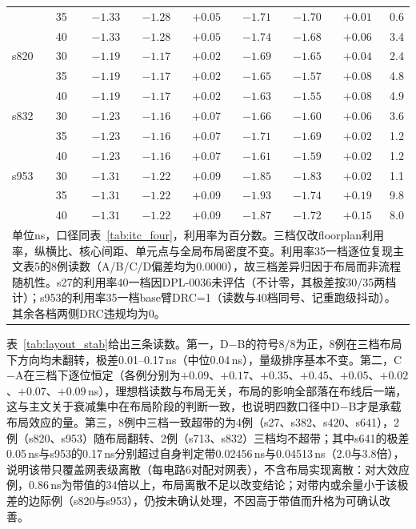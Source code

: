 \documentclass[twocolumn,10pt,fontset=windows]{ctexart}
\begin{document}
\begin{table}[t]
\begin{tabular}{lcrrrrrrr}
 & 35 & $-1.33$ & $-1.28$ & $+0.05$ & $-1.71$ & $-1.70$ & $+0.01$ & 0.6\\
 & 40 & $-1.33$ & $-1.28$ & $+0.05$ & $-1.74$ & $-1.68$ & $+0.06$ & 3.4\\
\midrule
s820 & 30 & $-1.19$ & $-1.17$ & $+0.02$ & $-1.69$ & $-1.65$ & $+0.04$ & 2.4\\
 & 35 & $-1.19$ & $-1.17$ & $+0.02$ & $-1.65$ & $-1.57$ & $+0.08$ & 4.8\\
 & 40 & $-1.19$ & $-1.17$ & $+0.02$ & $-1.63$ & $-1.55$ & $+0.08$ & 4.9\\
\midrule
s832 & 30 & $-1.23$ & $-1.16$ & $+0.07$ & $-1.66$ & $-1.60$ & $+0.06$ & 3.6\\
 & 35 & $-1.23$ & $-1.16$ & $+0.07$ & $-1.71$ & $-1.69$ & $+0.02$ & 1.2\\
 & 40 & $-1.23$ & $-1.16$ & $+0.07$ & $-1.61$ & $-1.59$ & $+0.02$ & 1.2\\
\midrule
s953 & 30 & $-1.31$ & $-1.22$ & $+0.09$ & $-1.85$ & $-1.83$ & $+0.02$ & 1.1\\
 & 35 & $-1.31$ & $-1.22$ & $+0.09$ & $-1.93$ & $-1.74$ & $+0.19$ & 9.8\\
 & 40 & $-1.31$ & $-1.22$ & $+0.09$ & $-1.87$ & $-1.72$ & $+0.15$ & 8.0\\
\bottomrule
\multicolumn{9}{p{0.92\textwidth}}{\footnotesize 单位ns，口径同表~\ref{tab:itc_four}，利用率为百分数。三档仅改floorplan利用率，纵横比、核心间距、单元点与全局布局密度不变。利用率35一档逐位复现主文表5的8例读数（A/B/C/D偏差均为0.0000），故三档差异归因于布局而非流程随机性。s27的利用率40一档因DPL-0036未评估（不计零，其极差按30/35两档计）；s953的利用率35一档base臂DRC=1（读数与40档同号、记重跑级抖动）。其余各档两侧DRC违规均为0。}\\
\end{tabular}
\end{table}

表~\ref{tab:layout_stab}给出三条读数。第一，D$-$B的符号8/8为正，8例在三档布局下方向均未翻转，极差0.01--0.17\,ns（中位0.04\,ns），量级排序基本不变。第二，C$-$A在三档下逐位恒定（各例分别为$+0.09$、$+0.17$、$+0.35$、$+0.45$、$+0.05$、$+0.02$、$+0.07$、$+0.09$\,ns），理想档读数与布局无关，布局的影响全部落在布线后一端，这与主文关于衰减集中在布局阶段的判断一致，也说明四数口径中D$-$B才是承载布局效应的量。第三，8例中三档一致超带的为4例（s27、s382、s420、s641），2例（s820、s953）随布局翻转、2例（s713、s832）三档均不超带；其中s641的极差0.05\,ns与s953的0.17\,ns分别超过自身判定带0.02456\,ns与0.04513\,ns（2.0与3.8倍），说明该带只覆盖网表级离散（每电路6对配对网表），不含布局实现离散：对大效应例，0.86\,ns为带值的34倍以上，布局离散不足以改变结论；对带内或余量小于该极差的边际例（s820与s953），仍按未确认处理，不因高于带值而升格为可确认改善。
\end{document}
